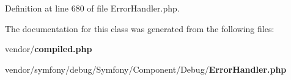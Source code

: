 Definition at line 680 of file Error\+Handler.\+php.



The documentation for this class was generated from the following files\+:\begin{DoxyCompactItemize}
\item 
vendor/{\bf compiled.\+php}\item 
vendor/symfony/debug/\+Symfony/\+Component/\+Debug/{\bf Error\+Handler.\+php}\end{DoxyCompactItemize}
